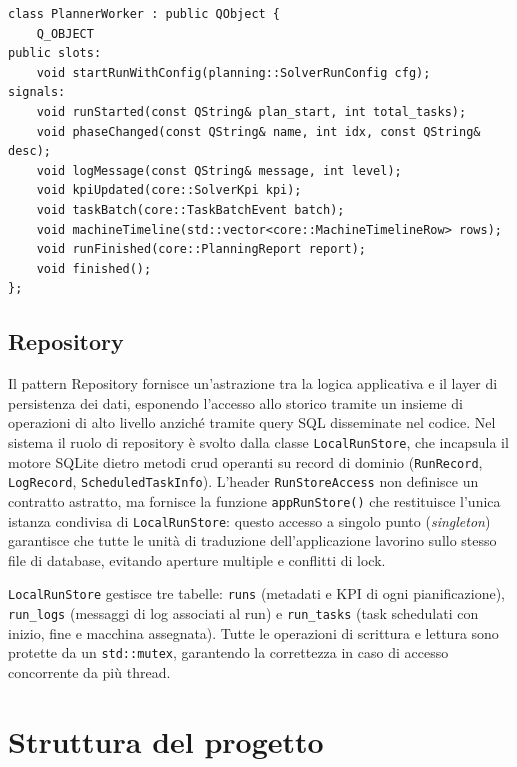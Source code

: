 \begin{listing}[H]
\begin{verbatim}
class PlannerWorker : public QObject {
    Q_OBJECT
public slots:
    void startRunWithConfig(planning::SolverRunConfig cfg);
signals:
    void runStarted(const QString& plan_start, int total_tasks);
    void phaseChanged(const QString& name, int idx, const QString& desc);
    void logMessage(const QString& message, int level);
    void kpiUpdated(core::SolverKpi kpi);
    void taskBatch(core::TaskBatchEvent batch);
    void machineTimeline(std::vector<core::MachineTimelineRow> rows);
    void runFinished(core::PlanningReport report);
    void finished();
};
\end{verbatim}
\caption{Interfaccia pubblica di \texttt{PlannerWorker} (semplificata).}
\label{listing:plannerworker}
\end{listing}

\subsection{Repository}
\label{subsec:repository}

Il pattern Repository fornisce un'astrazione tra la logica applicativa e il layer di persistenza dei dati, esponendo l'accesso allo storico tramite un insieme di operazioni di alto livello anziché tramite query SQL disseminate nel codice. Nel sistema il ruolo di repository è svolto dalla classe \texttt{LocalRunStore}, che incapsula il motore SQLite dietro metodi \gls{crud} operanti su record di dominio (\texttt{RunRecord}, \texttt{LogRecord}, \texttt{ScheduledTaskInfo}). L'header \texttt{RunStoreAccess} non definisce un contratto astratto, ma fornisce la funzione \texttt{appRunStore()} che restituisce l'unica istanza condivisa di \texttt{LocalRunStore}: questo accesso a singolo punto (\textit{singleton}) garantisce che tutte le unità di traduzione dell'applicazione lavorino sullo stesso file di database, evitando aperture multiple e conflitti di lock.

\texttt{LocalRunStore} gestisce tre tabelle: \texttt{runs} (metadati e KPI di ogni pianificazione), \texttt{run\_logs} (messaggi di log associati al run) e \texttt{run\_tasks} (task schedulati con inizio, fine e macchina assegnata). Tutte le operazioni di scrittura e lettura sono protette da un \texttt{std::mutex}, garantendo la correttezza in caso di accesso concorrente da più thread.

\section{Struttura del progetto}
\label{sec:struttura-progetto}

